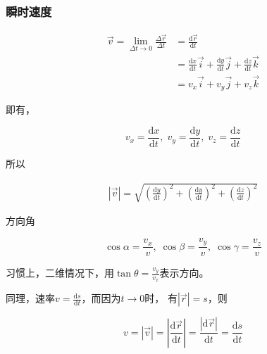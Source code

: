 \documentclass[
	12pt, %
	a4paper, %
]{myLegrandOrangeBook}
\newcommand{\rmd}{\mathrm{d}}
\begin{document}
\subsubsection*{瞬时速度}

    \vspace{1em}
    \begin{definition}[瞬时速度]

        \begin{equation}
            \begin{aligned}
                \overrightarrow{v} = \lim_{\Delta t \rightarrow 0}\frac{\Delta \overrightarrow{r}}{\Delta t}
                &= \frac{\rmd \overrightarrow{r}}{\rmd t}
                \\
                &= \frac{\rmd x}{\rmd t} \overrightarrow{i} + \frac{\rmd y}{\rmd t} \overrightarrow{j}
                + \frac{\rmd z}{\rmd t} \overrightarrow{k}
                \\
                & = v_{x} \overrightarrow{i} + v_{y} \overrightarrow{j} + v_{z} \overrightarrow{k}
            \end{aligned}
        \end{equation}

    \end{definition}

    即有，

    \[
        v_{x} = \frac{\rmd x}{\rmd t},\; v_{y} = \frac{\rmd y}{\rmd t},\; v_{z} = \frac{\rmd z}{\rmd t}
    \]

    所以

    \begin{align}
        \left|\overrightarrow{v} \right| = \sqrt{\left(\frac{\rmd y}{\rmd t}\right)^2 +
        \left(\frac{\rmd y}{\rmd t}\right)^2 + \left(\frac{\rmd z}{\rmd t}\right)^2}
    \end{align}

    方向角

    \[
        \cos \alpha = \frac{v_x}{v},\; \cos \beta = \frac{v_y}{v}, \;\cos \gamma = \frac{v_z}{v}
    \]

    习惯上，二维情况下，用\(\tan \theta = \frac{v_y}{v_x}\)表示方向。

    同理，速率\(v = \frac{\rmd s}{\rmd t}\)，而因为\(t \rightarrow 0\)时，
    有\(\left|\overrightarrow{r}\right| = s\)，则

    \[
        v = \left|\overrightarrow{v}\right| =
        \left|\frac{\rmd \overrightarrow{r}}{\rmd t}\right|
        = \frac{\left|\rmd \overrightarrow{r}\right|}{\rmd t}
        = \frac{\rmd s}{\rmd t}
    \]
\end{document}
